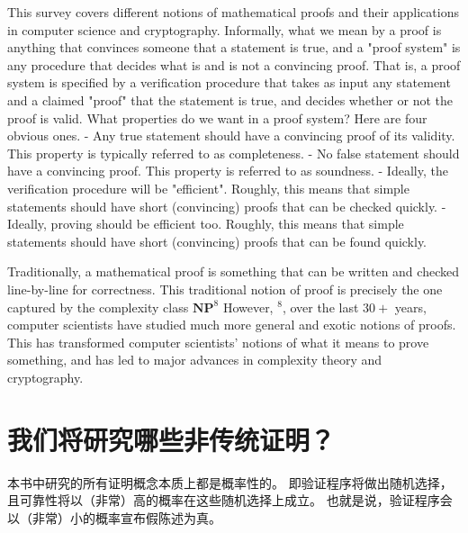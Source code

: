 This survey covers different notions of mathematical proofs and their applications in computer science and cryptography. Informally, what we mean by a proof is anything that convinces someone that a statement is true, and a "proof system" is any procedure that decides what is and is not a convincing proof. That is, a proof system is specified by a verification procedure that takes as input any statement and a claimed "proof" that the statement is true, and decides whether or not the proof is valid.
What properties do we want in a proof system? Here are four obvious ones.
- Any true statement should have a convincing proof of its validity. This property is typically referred to as completeness.
- No false statement should have a convincing proof. This property is referred to as soundness.
- Ideally, the verification procedure will be "efficient". Roughly, this means that simple statements should have short (convincing) proofs that can be checked quickly.
- Ideally, proving should be efficient too. Roughly, this means that simple statements should have short (convincing) proofs that can be found quickly.

Traditionally, a mathematical proof is something that can be written and checked line-by-line for correctness. This traditional notion of proof is precisely the one captured by the complexity class $\mathbf{N P}^8$ However, $^8$, over the last $30+$ years, computer scientists have studied much more general and exotic notions of proofs. This has transformed computer scientists' notions of what it means to prove something, and has led to major advances in complexity theory and cryptography.

\section{我们将研究哪些非传统证明？}
本书中研究的所有证明概念本质上都是概率性的。
即验证程序将做出随机选择，且可靠性将以（非常）高的概率在这些随机选择上成立。 
也就是说，验证程序会以（非常）小的概率宣布假陈述为真。

